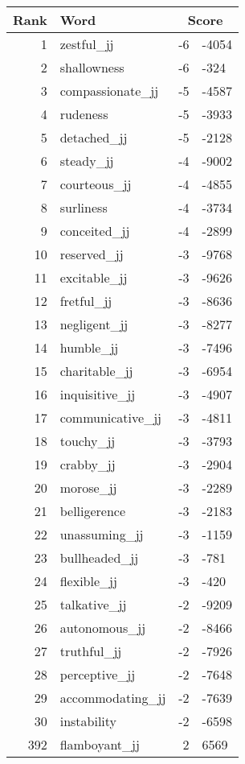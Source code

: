 \begin{longtable}[!htbp]{| rlr@{.}l |}
    \hline
    \textbf{Rank} & \textbf{Word} & \multicolumn{2}{c|}{\textbf{Score}} \\
    \hline
    \endhead
    1 & zestful\_jj & -6 & -4054 \\
    2 & shallowness & -6 & -324 \\
    3 & compassionate\_jj & -5 & -4587 \\
    4 & rudeness & -5 & -3933 \\
    5 & detached\_jj & -5 & -2128 \\
    6 & steady\_jj & -4 & -9002 \\
    7 & courteous\_jj & -4 & -4855 \\
    8 & surliness & -4 & -3734 \\
    9 & conceited\_jj & -4 & -2899 \\
    10 & reserved\_jj & -3 & -9768 \\
    11 & excitable\_jj & -3 & -9626 \\
    12 & fretful\_jj & -3 & -8636 \\
    13 & negligent\_jj & -3 & -8277 \\
    14 & humble\_jj & -3 & -7496 \\
    15 & charitable\_jj & -3 & -6954 \\
    16 & inquisitive\_jj & -3 & -4907 \\
    17 & communicative\_jj & -3 & -4811 \\
    18 & touchy\_jj & -3 & -3793 \\
    19 & crabby\_jj & -3 & -2904 \\
    20 & morose\_jj & -3 & -2289 \\
    21 & belligerence & -3 & -2183 \\
    22 & unassuming\_jj & -3 & -1159 \\
    23 & bullheaded\_jj & -3 & -781 \\
    24 & flexible\_jj & -3 & -420 \\
    25 & talkative\_jj & -2 & -9209 \\
    26 & autonomous\_jj & -2 & -8466 \\
    27 & truthful\_jj & -2 & -7926 \\
    28 & perceptive\_jj & -2 & -7648 \\
    29 & accommodating\_jj & -2 & -7639 \\
    30 & instability & -2 & -6598 \\
    392 & flamboyant\_jj & 2 & 6569 \\

\end{longtable}
